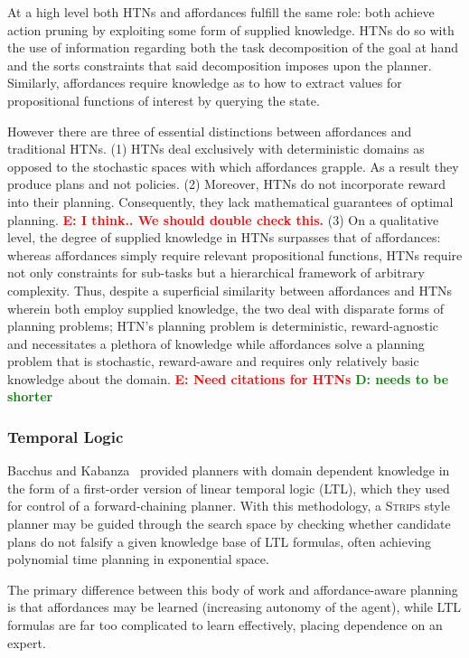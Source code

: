 \documentclass[conference]{IEEEtran}
\newcommand{\dnote}[1]{\textcolor{Green}{\textbf{D: #1}}}
\newcommand{\enote}[1]{\textcolor{Red}{\textbf{E: #1}}}
\begin{document}
At a high level both HTNs and affordances fulfill the same role: both achieve action pruning by exploiting some form of supplied knowledge. HTNs do so with the use of information regarding both the task decomposition of the goal at hand and the sorts constraints that said decomposition imposes upon the planner. Similarly, affordances require knowledge as to how to extract values for propositional functions of interest by querying the state.

However there are three of essential distinctions between affordances and traditional HTNs. (1) HTNs deal exclusively with deterministic domains as opposed to the stochastic spaces with which affordances grapple. As a result they produce plans and not policies. (2) Moreover, HTNs do not incorporate reward into their planning. Consequently, they lack mathematical guarantees of optimal planning. \enote{I think.. We should double check this.} (3) On a qualitative level, the degree of supplied knowledge in HTNs surpasses that of affordances: whereas affordances simply require relevant propositional functions, HTNs require not only constraints for sub-tasks but a hierarchical framework of arbitrary complexity. Thus, despite a superficial similarity between affordances and HTNs wherein both employ supplied knowledge, the two deal with disparate forms of planning problems; HTN's planning problem is deterministic, reward-agnostic and necessitates a plethora of knowledge while affordances solve a planning problem that is stochastic, reward-aware and requires only relatively basic knowledge about the domain.
\enote{Need citations for HTNs}
\dnote{needs to be shorter}
\subsubsection{Temporal Logic}

Bacchus and Kabanza~\cite{Bacchus95usingtemporal,Bacchus99usingtemporal} provided
planners with domain dependent knowledge in the form of a first-order version of linear
temporal logic (LTL), which they used for control of a forward-chaining planner. With this methodology, 
a \textsc{Strips} style planner may be guided through the search space by checking 
whether candidate plans do not falsify a given knowledge base of LTL formulas, often
achieving polynomial time planning in exponential space.

The primary difference between this body of work and affordance-aware planning is that affordances may be learned (increasing autonomy of the agent), while LTL formulas are far too complicated to learn effectively, placing dependence on an expert.
\end{document}
